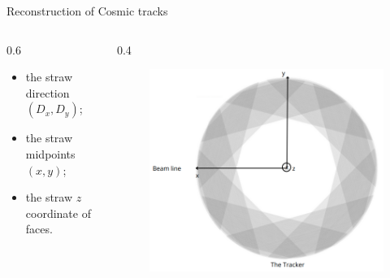 \documentclass{beamer}[10pt]
\begin{document}
\begin{frame}{Reconstruction of Cosmic tracks}
\begin{columns}
\begin{column}{0.6 \framewidth}
\begin{itemize}
    \begin{itemize}
        \item the straw direction  $(D_x,D_y)$;
        \vspace{1mm}
        \item the straw midpoints $(x,y)$;
        \vspace{1mm}
        \item the straw $z$ coordinate of faces.
    \end{itemize} 
  \end{itemize} 
  \end{column}
  \begin{column}{0.4 \framewidth}
    \begin{figure}[H]
      \centering
      \includegraphics[width=0.8 \columnwidth]{figures/png/Screenshot_20240408_154724.png}
      \label{fig:enter-label}
  \end{figure}
  \end{column}

  \end{columns}
  \end{frame}
\end{document}
